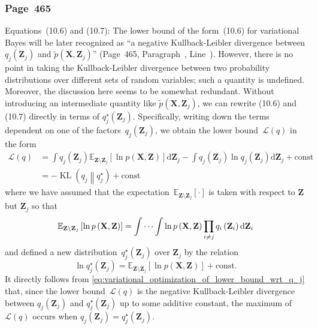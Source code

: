 \documentclass[12pt,a4paper]{article}
\newcommand{\erratum}[1]{%
\subsubsection*{#1}
\addcontentsline{toc}{subsection}{#1}}
\begin{document}
\erratum{Page~465}
Equations~(10.6) and (10.7):
The lower bound of the form~(10.6) for variational Bayes will be later recognized as
``a negative Kullback-Leibler divergence between
$q_j(\mathbf{Z}_j)$ and $\widetilde{p}(\mathbf{X}, \mathbf{Z}_j)$''
(Page~465, Paragraph~, Line~).
However, there is no point in taking the Kullback-Leibler divergence between two probability
distributions over different sets of random variables; such a quantity is undefined.
Moreover, the discussion here seems to be somewhat redundant.
Without introducing an intermediate quantity like $\widetilde{p}(\mathbf{X}, \mathbf{Z}_j)$,
we can rewrite (10.6) and (10.7) directly in terms of $q_j^{\star}(\mathbf{Z}_j)$.
Specifically,
writing down the terms dependent on one of the factors~$q_j\left(\mathbf{Z}_j\right)$,
we obtain the lower bound~$\mathcal{L}(q)$ in the form
\begin{align}
\mathcal{L}(q)
&= \int q_j\left(\mathbf{Z}_j\right)
\mathbb{E}_{\mathbf{Z}\setminus\mathbf{Z}_j}
\left[ \ln p\left(\mathbf{X}, \mathbf{Z}\right) \right]
\mathrm{d}\mathbf{Z}_j
- \int q_j\left(\mathbf{Z}_j\right) \ln q_j\left(\mathbf{Z}_j\right) \mathrm{d}\mathbf{Z}_j
 + \text{const} \\
&= - \operatorname{KL}\left( q_j \middle\| q_j^{\star} \right) + \text{const}
\label{eq:variational_optimization_of_lower_bound_wrt_q_j}
\end{align}
where we have assumed that the expectation~$\mathbb{E}_{\mathbf{Z}\setminus\mathbf{Z}_j}[\cdot]$
is taken with respect to $\mathbf{Z}$ but $\mathbf{Z}_j$ so that
\begin{equation}
\mathbb{E}_{\mathbf{Z}\setminus\mathbf{Z}_j}
\left[ \ln p\left(\mathbf{X}, \mathbf{Z}\right) \right] =
\idotsint \ln p\left(\mathbf{X}, \mathbf{Z}\right)
\prod_{i \neq j} q_i\left(\mathbf{Z}_i\right) \mathrm{d}\mathbf{Z}_i
\end{equation}
and defined a new distribution~$q_j^{\star}\left(\mathbf{Z}_j\right)$ over
$\mathbf{Z}_j$ by the relation
\begin{equation}
\ln q_j^{\star}\left(\mathbf{Z}_j\right) =
\mathbb{E}_{\mathbf{Z}\setminus\mathbf{Z}_j}
\left[ \ln p\left(\mathbf{X}, \mathbf{Z}\right) \right] + \text{const}.
\label{eq:optimal_solution_for_variational_bayes}
\end{equation}
It directly follows from \eqref{eq:variational_optimization_of_lower_bound_wrt_q_j} that,
since the lower bound~$\mathcal{L}(q)$ is the negative Kullback-Leibler divergence between
$q_j(\mathbf{Z}_j)$ and $q_j^{\star}(\mathbf{Z}_j)$ up to some additive constant,
the maximum of $\mathcal{L}(q)$ occurs when $q_j(\mathbf{Z}_j) = q_j^{\star}(\mathbf{Z}_j)$.
\end{document}
